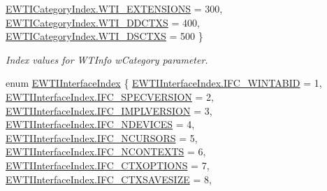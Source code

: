 \begin{DoxyCompactItemize}
\mbox{\hyperlink{namespace_wintab_d_n_aeb27579e91c95fb5a7bf4a4a9dc7f875a4a581c91c398d49adb7d4e2271195648}{E\+W\+T\+I\+Category\+Index.\+W\+T\+I\+\_\+\+E\+X\+T\+E\+N\+S\+I\+O\+NS}} = 300, 
\mbox{\hyperlink{namespace_wintab_d_n_aeb27579e91c95fb5a7bf4a4a9dc7f875ad5b18b294793c4f58c270459876cdf4e}{E\+W\+T\+I\+Category\+Index.\+W\+T\+I\+\_\+\+D\+D\+C\+T\+XS}} = 400, 
\newline
\mbox{\hyperlink{namespace_wintab_d_n_aeb27579e91c95fb5a7bf4a4a9dc7f875accd1360fe596c46f84d0cce24206a6f0}{E\+W\+T\+I\+Category\+Index.\+W\+T\+I\+\_\+\+D\+S\+C\+T\+XS}} = 500
 \}
\begin{DoxyCompactList}\small\item\em Index values for W\+T\+Info w\+Category parameter. \end{DoxyCompactList}\item 
enum \mbox{\hyperlink{namespace_wintab_d_n_a9db915754a02c42282c3766bfbafabe4}{E\+W\+T\+I\+Interface\+Index}} \{ \newline
\mbox{\hyperlink{namespace_wintab_d_n_a9db915754a02c42282c3766bfbafabe4aa4c992eca8fadaa75fa4d0910bdcbccc}{E\+W\+T\+I\+Interface\+Index.\+I\+F\+C\+\_\+\+W\+I\+N\+T\+A\+B\+ID}} = 1, 
\mbox{\hyperlink{namespace_wintab_d_n_a9db915754a02c42282c3766bfbafabe4ab9bed5dd215fbeec0007239b1850b9f7}{E\+W\+T\+I\+Interface\+Index.\+I\+F\+C\+\_\+\+S\+P\+E\+C\+V\+E\+R\+S\+I\+ON}} = 2, 
\mbox{\hyperlink{namespace_wintab_d_n_a9db915754a02c42282c3766bfbafabe4a5f808e9fc4d2ffbd19377e7c06f927f2}{E\+W\+T\+I\+Interface\+Index.\+I\+F\+C\+\_\+\+I\+M\+P\+L\+V\+E\+R\+S\+I\+ON}} = 3, 
\mbox{\hyperlink{namespace_wintab_d_n_a9db915754a02c42282c3766bfbafabe4af71e168a75784ef330769eec1dd60621}{E\+W\+T\+I\+Interface\+Index.\+I\+F\+C\+\_\+\+N\+D\+E\+V\+I\+C\+ES}} = 4, 
\newline
\mbox{\hyperlink{namespace_wintab_d_n_a9db915754a02c42282c3766bfbafabe4a9e32e34f37e8e5ed8220c15a104cdc18}{E\+W\+T\+I\+Interface\+Index.\+I\+F\+C\+\_\+\+N\+C\+U\+R\+S\+O\+RS}} = 5, 
\mbox{\hyperlink{namespace_wintab_d_n_a9db915754a02c42282c3766bfbafabe4a4d401777c6d7a245345dcd0b55b75129}{E\+W\+T\+I\+Interface\+Index.\+I\+F\+C\+\_\+\+N\+C\+O\+N\+T\+E\+X\+TS}} = 6, 
\mbox{\hyperlink{namespace_wintab_d_n_a9db915754a02c42282c3766bfbafabe4ae1ffd32a8c5c3359303ad696444351d3}{E\+W\+T\+I\+Interface\+Index.\+I\+F\+C\+\_\+\+C\+T\+X\+O\+P\+T\+I\+O\+NS}} = 7, 
\mbox{\hyperlink{namespace_wintab_d_n_a9db915754a02c42282c3766bfbafabe4a85b331c529261ec1bb740876a588040b}{E\+W\+T\+I\+Interface\+Index.\+I\+F\+C\+\_\+\+C\+T\+X\+S\+A\+V\+E\+S\+I\+ZE}} = 8, 
\newline

\end{DoxyCompactItemize}
